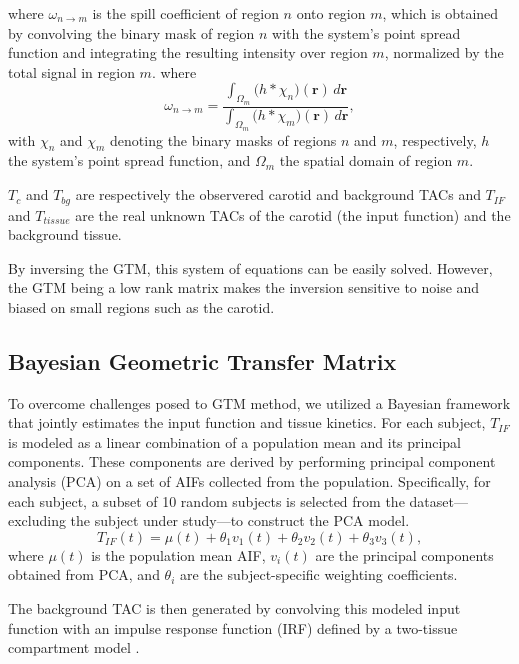 where $\omega_{n \rightarrow m}$ is the spill coefficient of region $n$ onto region $m$, which is obtained by convolving the binary mask of region $n$ with the system's point spread function and integrating the resulting intensity over region $m$, normalized by the total signal in region $m$.
where
\begin{equation}
	\omega_{n\to m} = \frac{\displaystyle \int_{\Omega_m} \bigl( h \ast \chi_n \bigr)(\mathbf{r})\,d\mathbf{r}}{\displaystyle \int_{\Omega_m} \bigl( h \ast \chi_m \bigr)(\mathbf{r})\,d\mathbf{r}},
\end{equation}
with \(\chi_n\) and \(\chi_m\) denoting the binary masks of regions \(n\) and \(m\), respectively, \(h\) the system's point spread function, and \(\Omega_m\) the spatial domain of region \(m\).

$T_{c}$ and $T_{bg}$ are respectively the observered carotid and background TACs and $T_{IF}$ and $T_{tissue}$ are the real unknown TACs of the carotid (the input function) and the background tissue.

By inversing the GTM, this system of equations can be easily solved. However, the GTM being a low rank matrix makes the inversion sensitive to noise and biased on small regions such as the carotid.

\subsection{Bayesian Geometric Transfer Matrix}
To overcome challenges posed to GTM method, we utilized a Bayesian framework that jointly estimates the input function and tissue kinetics.
For each subject, $T_{IF}$ is modeled as a linear combination of a population mean and its principal components.
These components are derived by performing principal component analysis (PCA) on a set of AIFs collected from the population. Specifically, for each subject, a subset of 10 random subjects is selected from the dataset—excluding the subject under study—to construct the PCA model.
\begin{equation}
	T_{IF}(t) = \mu(t) + \theta_{1} v_{1}(t) + \theta_{2} v_{2}(t) + \theta_{3} v_{3}(t),
\end{equation}
where \(\mu(t)\) is the population mean AIF, \(v_{i}(t)\) are the principal components obtained from PCA, and \(\theta_{i}\) are the subject-specific weighting coefficients.

The background TAC is then generated by convolving this modeled input function with an impulse response function (IRF) defined by a two-tissue compartment model \cite{jouvie2013estimation}.

